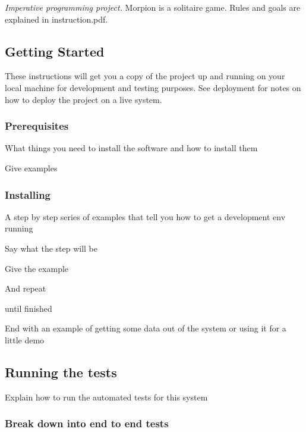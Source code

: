 {\itshape Imperative programming project.} Morpion is a solitaire game. Rules and goals are explained in \textquotesingle{}instruction.\+pdf\textquotesingle{}.

\subsection*{Getting Started}

These instructions will get you a copy of the project up and running on your local machine for development and testing purposes. See deployment for notes on how to deploy the project on a live system.

\subsubsection*{Prerequisites}

What things you need to install the software and how to install them


\begin{DoxyCode}
Give examples
\end{DoxyCode}


\subsubsection*{Installing}

A step by step series of examples that tell you how to get a development env running

Say what the step will be


\begin{DoxyCode}
Give the example
\end{DoxyCode}


And repeat


\begin{DoxyCode}
until finished
\end{DoxyCode}


End with an example of getting some data out of the system or using it for a little demo

\subsection*{Running the tests}

Explain how to run the automated tests for this system

\subsubsection*{Break down into end to end tests}

